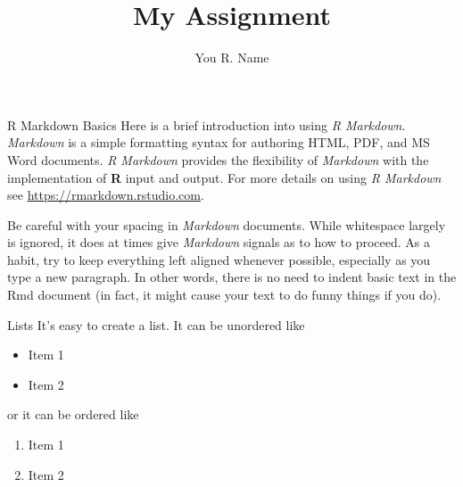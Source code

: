 \documentclass{beamer}
\author{You R. Name}
\title{My Assignment}
\providecommand{\tightlist}{\setlength{\itemsep}{0pt}\setlength{\parskip}{0pt}}
\begin{document}
\begin{frame}
  \titlepage
\end{frame}

\begin{frame}
\end{frame}

\begin{frame}{R Markdown Basics}
\protect\hypertarget{rmd-basics}{}
Here is a brief introduction into using \emph{R Markdown}.
\emph{Markdown} is a simple formatting syntax for authoring HTML, PDF,
and MS Word documents. \emph{R Markdown} provides the flexibility of
\emph{Markdown} with the implementation of \textbf{R} input and output.
For more details on using \emph{R Markdown} see
\url{https://rmarkdown.rstudio.com}.
\end{frame}

\begin{frame}
Be careful with your spacing in \emph{Markdown} documents. While
whitespace largely is ignored, it does at times give \emph{Markdown}
signals as to how to proceed. As a habit, try to keep everything left
aligned whenever possible, especially as you type a new paragraph. In
other words, there is no need to indent basic text in the Rmd document
(in fact, it might cause your text to do funny things if you do).
\end{frame}

\begin{frame}
\begin{block}{Lists}
\protect\hypertarget{lists}{}
It's easy to create a list. It can be unordered like

\begin{itemize}
\tightlist
\item
  Item 1
\item
  Item 2
\end{itemize}

or it can be ordered like

\begin{enumerate}
\tightlist
\item
  Item 1
\item
  Item 2
\end{enumerate}
\end{block}
\end{frame}
\end{document}

